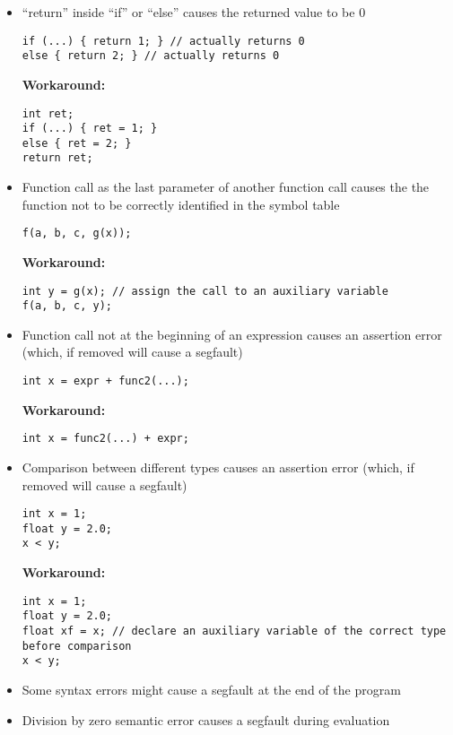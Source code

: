 \begin{itemize}
\item “return” inside “if” or “else” causes the returned value to be 0
\begin{lstlisting}
if (...) { return 1; } // actually returns 0
else { return 2; } // actually returns 0
\end{lstlisting}

\textbf{Workaround:}
\begin{lstlisting}
int ret;
if (...) { ret = 1; }
else { ret = 2; }
return ret;
\end{lstlisting}


\item Function call as the last parameter of another function call causes the the function not to be correctly identified in the symbol table
\begin{lstlisting}
f(a, b, c, g(x));
\end{lstlisting}

\textbf{Workaround:}
\begin{lstlisting}
int y = g(x); // assign the call to an auxiliary variable
f(a, b, c, y);
\end{lstlisting}


\item Function call not at the beginning of an expression causes an assertion error (which, if removed will cause a segfault)
\begin{lstlisting}
int x = expr + func2(...);
\end{lstlisting}

\textbf{Workaround:}
\begin{lstlisting}
int x = func2(...) + expr;
\end{lstlisting}


\item Comparison between different types causes an assertion error (which, if removed will cause a segfault)
\begin{lstlisting}
int x = 1;
float y = 2.0;
x < y;
\end{lstlisting}
\textbf{Workaround:}
\begin{lstlisting}
int x = 1;
float y = 2.0;
float xf = x; // declare an auxiliary variable of the correct type before comparison
x < y;
\end{lstlisting}

\item Some syntax errors might cause a segfault at the end of the program
\item Division by zero semantic error causes a segfault during evaluation

\end{itemize}


